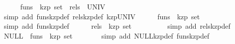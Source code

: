 \begin{isabellebody}
\isanewline
\ \ \ \ \isamarkupfalse%
\ {}{}funs\ {}{}\ kzp\ set{}\ {}\ rels\ {}\ UNIV{}\isanewline
\ \ \ \ \ \ \isamarkupfalse%
\ {}simp\ add{}\ funs{}kzp{}def\ rels{}kzp{}def\ kzp{}UNIV{}\isanewline
\isanewline
\ \ \ \ \isamarkupfalse%
\ {}{}funs\ {}{}\ kzp\ set{}\ {}\ {}{}{}\isanewline
\ \ \ \ \ \ \isamarkupfalse%
\ {}simp\ add{}\ funs{}kzp{}def{}\isanewline
\isanewline
\ \ \ \ \isamarkupfalse%
\ {}{}rels\ {}{}\ kzp\ set{}\ {}\ {}{}{}\isanewline
\ \ \ \ \ \ \isamarkupfalse%
\ {}simp\ add{}\ rels{}kzp{}def{}\isanewline
\isanewline
\ \ \ \ \isamarkupfalse%
\ {}NULL\ {}\ {}funs\ {}{}\ kzp\ set{}{}\isanewline
\ \ \ \ \ \ \isamarkupfalse%
\ {}simp\ add{}\ NULL{}kzp{}def\ funs{}kzp{}def{}\isanewline

\end{isabellebody}
